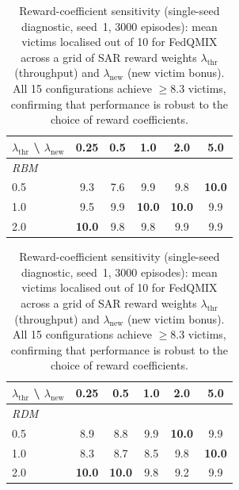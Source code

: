 \begin{table}[t]
\centering
\caption{Reward-coefficient sensitivity (single-seed diagnostic, seed~1, 3000 episodes):
mean victims localised out of 10 for FedQMIX across a grid of SAR reward weights
$\lambda_{\mathrm{thr}}$ (throughput) and $\lambda_{\mathrm{new}}$ (new victim bonus).
All 15 configurations achieve $\geq\!8.3$ victims, confirming that performance is
robust to the choice of reward coefficients.}
\label{tab:lambda_sensitivity}
\small
\begin{tabular}{lccccc}
\toprule
$\lambda_{\mathrm{thr}}$ \textbackslash{} $\lambda_{\mathrm{new}}$ & 0.25 & 0.5 & 1.0 & 2.0 & 5.0 \\
\midrule
\multicolumn{6}{l}{\textit{RBM}} \\
0.5 & 9.3 & 7.6 & 9.9 & 9.8 & \textbf{10.0} \\
1.0 & 9.5 & 9.9 & \textbf{10.0} & \textbf{10.0} & 9.9 \\
2.0 & \textbf{10.0} & 9.8 & 9.8 & 9.9 & 9.9 \\
\bottomrule
\end{tabular}
\vspace{4pt}
\begin{tabular}{lccccc}
\toprule
$\lambda_{\mathrm{thr}}$ \textbackslash{} $\lambda_{\mathrm{new}}$ & 0.25 & 0.5 & 1.0 & 2.0 & 5.0 \\
\midrule
\multicolumn{6}{l}{\textit{RDM}} \\
0.5 & 8.9 & 8.8 & 9.9 & \textbf{10.0} & 9.9 \\
1.0 & 8.3 & 8.7 & 8.5 & 9.8 & \textbf{10.0} \\
2.0 & \textbf{10.0} & \textbf{10.0} & 9.8 & 9.2 & 9.9 \\
\bottomrule
\end{tabular}
\end{table}
